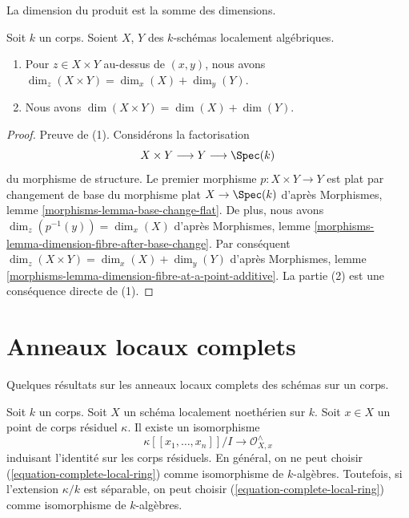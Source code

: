 \begin{lemma}
\label{lemma-dimension-product-locally-algebraic}
\begin{slogan}
La dimension du produit est la somme des dimensions.
\end{slogan}
Soit $k$ un corps. Soient $X$, $Y$ des $k$-schémas localement algébriques.
\begin{enumerate}
\item Pour $z \in X \times Y$ au-dessus de $(x, y)$,
nous avons $\dim_z(X \times Y) = \dim_x(X) + \dim_y(Y)$.
\item Nous avons $\dim(X \times Y) = \dim(X) + \dim(Y)$.
\end{enumerate}
\end{lemma}

\begin{proof}
Preuve de (1). Considérons la factorisation
$$
X \times Y \longrightarrow Y \longrightarrow \Spec(k)
$$
du morphisme de structure. Le premier morphisme $p : X \times Y \to
Y$ est plat par changement de base du morphisme plat $X \to
\Spec(k)$ d'après Morphismes, lemme
\ref{morphisms-lemma-base-change-flat}. De plus, nous avons
$\dim_z(p^{-1}(y)) = \dim_x(X)$ d'après Morphismes, lemme
\ref{morphisms-lemma-dimension-fibre-after-base-change}. Par conséquent $\dim_z(X
\times Y) = \dim_x(X) + \dim_y(Y)$ d'après Morphismes, lemme
\ref{morphisms-lemma-dimension-fibre-at-a-point-additive}. La partie (2) est une conséquence directe de (1).
\end{proof}






\section{Anneaux locaux complets}
\label{section-complete-local-rings}

\noindent
Quelques résultats sur les anneaux locaux complets des schémas sur un corps.

\begin{lemma}
\label{lemma-complete-local-ring-structure-as-algebra}
Soit $k$ un corps. Soit $X$ un
schéma localement noethérien sur $k$. Soit $x \in X$
un point de corps résiduel $\kappa$. Il existe un isomorphisme
\begin{equation}
\label{equation-complete-local-ring}
\kappa[[x_1, \ldots, x_n]]/I \longrightarrow \mathcal{O}_{X, x}^\wedge
\end{equation}
induisant l'identité sur les corps résiduels. En général, on ne
peut choisir (\ref{equation-complete-local-ring}) comme
isomorphisme de $k$-algèbres. Toutefois, si l'extension
$\kappa/k$ est séparable, on peut choisir
(\ref{equation-complete-local-ring}) comme isomorphisme de $k$-algèbres.
\end{lemma}


